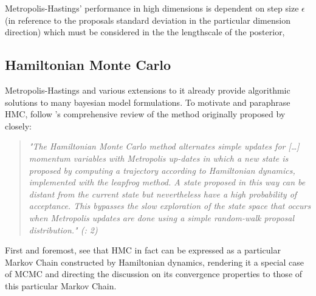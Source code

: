 \documentclass[11pt]{article}
\begin{document}

        \citep{mackay2003information} Metropolis-Hastings' performance in high dimensions is dependent on step size $\epsilon$ (in reference to the proposals standard deviation in the particular dimension direction) which must be considered in the the lengthscale of the posterior,  %




        \subsection{Hamiltonian Monte Carlo}
        Metropolis-Hastings and various extensions to it already provide algorithmic solutions to many bayesian model formulations.
        To motivate and paraphrase HMC, follow  \citep{neal2011mcmc}'s comprehensive review of the method originally proposed by %
        closely:

        \begin{quote}
            \it{"The Hamiltonian Monte Carlo method alternates simple updates for [\dots] momentum variables with Metropolis up-dates in which a new state is proposed by computing a trajectory according to Hamiltonian dynamics, implemented with the leapfrog method. A state proposed in this way can be distant from the current state but nevertheless have a high probability of acceptance. This bypasses the slow exploration of the state space that occurs when Metropolis updates are done using a simple random-walk proposal distribution."}   \normalfont     (\citep{neal2011mcmc}: 2)
        \end{quote}

        First and foremost, see that HMC in fact can be expressed as a particular Markov Chain constructed by Hamiltonian dynamics, rendering it a special case of MCMC and directing the discussion on its convergence properties to those of this particular Markov Chain.
\end{document}
